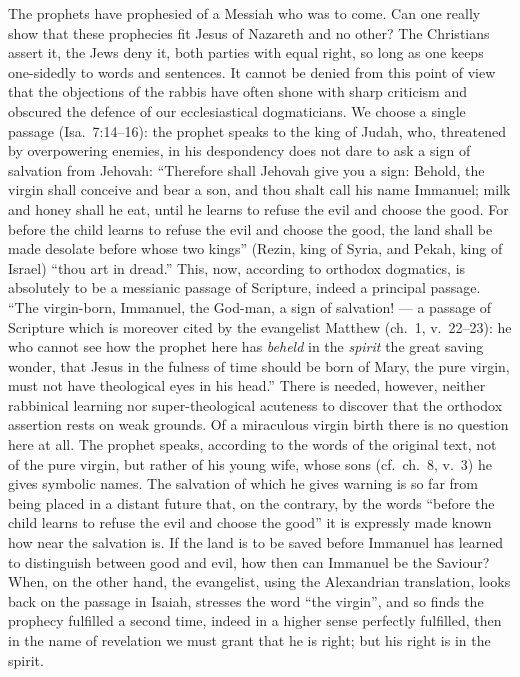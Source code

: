 \documentclass[12pt,a4paper,openany]{book}
\newcommand{\opage}[1]{\marginnote{\footnotesize\textit{[#1]}}}
\begin{document}
The prophets have prophesied of a Messiah who
was to come. Can one really show that these
prophecies fit Jesus of Nazareth and no
other? The Christians assert it, the Jews deny it,
both parties with equal right, so long as one keeps one-sidedly
to words and sentences. It cannot be denied from this
point of view that the objections of the rabbis
have often shone with sharp criticism and obscured the defence of our
ecclesiastical dogmaticians. We choose a single
passage (Isa.~7:14--16): the prophet speaks to the king of Judah,
who, threatened by overpowering enemies, in his despondency does not
\setcounter{footnote}{0}%
\opage{45}dare to ask a sign of salvation from Jehovah: ``Therefore shall
Jehovah give you a sign: Behold, the virgin shall conceive
and bear a son, and thou shalt call his name
Immanuel; milk and honey shall he eat, until he
learns to refuse the evil and choose the good. For
before the child learns to refuse the evil and choose
the good, the land shall be made desolate before whose two
kings'' (Rezin, king of Syria, and Pekah, king of Israel)
``thou art in dread.'' This, now, according to orthodox
dogmatics, is absolutely to be a messianic passage of Scripture,
indeed a principal passage. ``The virgin-born, Immanuel,
the God-man, a sign of salvation! --- a passage of Scripture which
is moreover cited by the evangelist Matthew (ch.~1,
v.~22--23): he who cannot see how the prophet
here has \emph{beheld} in the \emph{spirit} the great saving wonder,
that Jesus in the fulness of time should be born of Mary, the pure
virgin, must not have theological eyes in his head.''
There is needed, however, neither rabbinical learning nor
super-theological acuteness to discover that the
orthodox assertion rests on weak grounds. Of a
miraculous virgin birth there is no question here at all. The prophet
speaks, according to the words of the original text, not of the
pure virgin, but rather of his young wife, whose
sons (cf.~ch.~8, v.~3) he gives symbolic names.
The salvation of which he gives warning is so far from being
placed in a distant future that, on the contrary, by the
words ``before the child learns to refuse the evil
and choose the good'' it is expressly made known how
near the salvation is. If the land is to be saved before
Immanuel has learned to distinguish between good and evil,
how then can Immanuel be the Saviour? When,
on the other hand, the evangelist, using the Alexandrian
\setcounter{footnote}{0}%
\opage{46}translation, looks back on the passage in Isaiah, stresses
the word ``the virgin'', and so finds the prophecy
fulfilled a second time, indeed in a higher sense perfectly
fulfilled, then in the name of revelation we must grant that he is
right; but his right is in the spirit.
\end{document}

